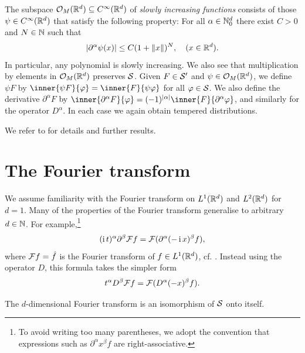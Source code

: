 \documentclass[article, a4paper, 11pt, oneside]{memoir}
\let\phi\varphi
\numberwithin{equation}{chapter}
\theoremstyle{myexample}
\theoremstyle{myexample}
\theoremstyle{myexamplebreak}
\theoremstyle{myexamplebreak}
\theoremstyle{nonumberplain}
\theoremstyle{MyNonumberplain}
\begin{document}
The subspace $\mathcal{O}_M(\mathbb{R}^d) \subseteq C^\infty(\mathbb{R}^d)$ of \emph{slowly increasing functions} consists of those $\psi \in C^\infty(\mathbb{R}^d)$ that satisfy the following property: For all $\alpha \in \mathbb{N}_0^d$ there exist $C > 0$ and $N \in \mathbb{N}$ such that
%
\begin{equation*}
    \lvert\partial^\alpha \psi(x)\rvert
        \leq C (1 + \lVert x\rVert)^N,
        \quad (x \in \mathbb{R}^d).
\end{equation*}
%
In particular, any polynomial is slowly increasing. We also see that multiplication by elements in $\mathcal{O}_M(\mathbb{R}^d)$ preserves $\mathcal{S}$. Given $F \in \mathcal{S}'$ and $\psi \in \mathcal{O}_M(\mathbb{R}^d)$, we define $\psi F$ by $\inner{\psi F}{\phi} = \inner{F}{\psi\phi}$ for all $\phi \in \schwartz$. We also define the derivative $\partial^\alpha F$ by $\inner{\partial^\alpha F}{\phi} = (-1)^{\abs{\alpha}} \inner{F}{\partial^\alpha \phi}$, and similarly for the operator $D^\alpha$. In each case we again obtain tempered distributions.

We refer to \textcite[Chapter~5]{grubb2009} for details and further results.


\section{The Fourier transform}

We assume familiarity with the Fourier transform on $L^1(\mathbb{R}^d)$ and $L^2(\mathbb{R}^d)$ for $d = 1$. Many of the properties of the Fourier transform generalise to arbitrary $d \in \mathbb{N}$. For example,\footnote{To avoid writing too many parentheses, we adopt the convention that expressions such as $\partial^\alpha x^\beta f$ are right-associative.}
%
\begin{equation}
    (\operatorname{i} t)^\alpha \partial^\beta \mathcal{F} f = \mathcal{F}( \partial^\alpha (-\operatorname{i} x)^\beta f ),
\end{equation}
%
where $\mathcal{F} f = \hat f$ is the Fourier transform of $f \in L^1(\mathbb{R}^d)$, cf. \textcite[Theorem~8.22]{folland2007}. Instead using the operator $D$, this formula takes the simpler form
%
\begin{equation}
    \label{eq:fourier_D}
    t^\alpha D^\beta \mathcal{F} f = \mathcal{F}( D^\alpha (-x)^\beta f ).
\end{equation}

\begin{theorem}
    The $d$-dimensional Fourier transform is an isomorphism of $\mathcal{S}$ onto itself.
\end{theorem}
\end{document}
